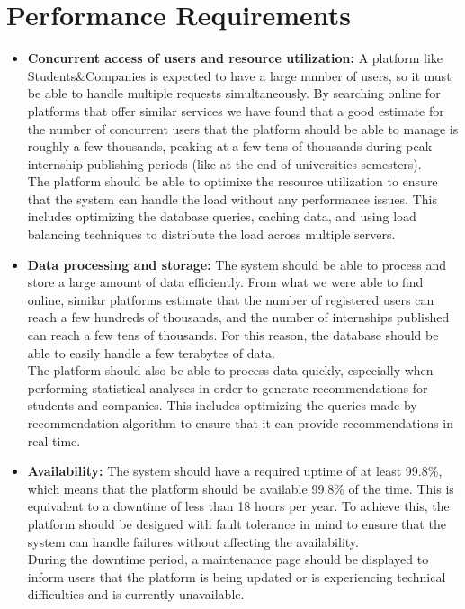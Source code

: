\section{Performance Requirements}
\begin{itemize}
    \item \textbf{Concurrent access of users and resource utilization:} A platform like Students\&Companies is expected to have a large
    number of users, so it must be able to handle multiple requests simultaneously. By searching online for platforms that offer similar
    services we have found that a good estimate for the number of concurrent users that the platform should be able to manage is roughly
    a few thousands, peaking at a few tens of thousands during peak internship publishing periods (like at the end of universities semesters). \\
    The platform should be able to optimixe the resource utilization to ensure that the system can handle the load without any performance
    issues. This includes optimizing the database queries, caching data, and using load balancing techniques to distribute the load across
    multiple servers.
    
    \item \textbf{Data processing and storage:} The system should be able to process and store a large amount of data efficiently. From 
    what we were able to find online, similar platforms estimate that the number of registered users can reach a few hundreds of thousands,
    and the number of internships published can reach a few tens of thousands. For this reason, the database should be able to easily handle
    a few terabytes of data. \\
    The platform should also be able to process data quickly, especially when performing statistical analyses in order to generate recommendations 
    for students and companies. This includes optimizing the queries made by recommendation algorithm to ensure that it can provide 
    recommendations in real-time.

    \item \textbf{Availability:} The system should have a required uptime of at least 99.8\%, which means that the platform should be
    available 99.8\% of the time. This is equivalent to a downtime of less than 18 hours per year. To achieve this, the platform should be
    designed with fault tolerance in mind to ensure that the system can handle failures without affecting the availability. \\
    During the downtime period, a maintenance page should be displayed to inform users that the platform is being updated or is experiencing
    technical difficulties and is currently unavailable.


\end{itemize}
